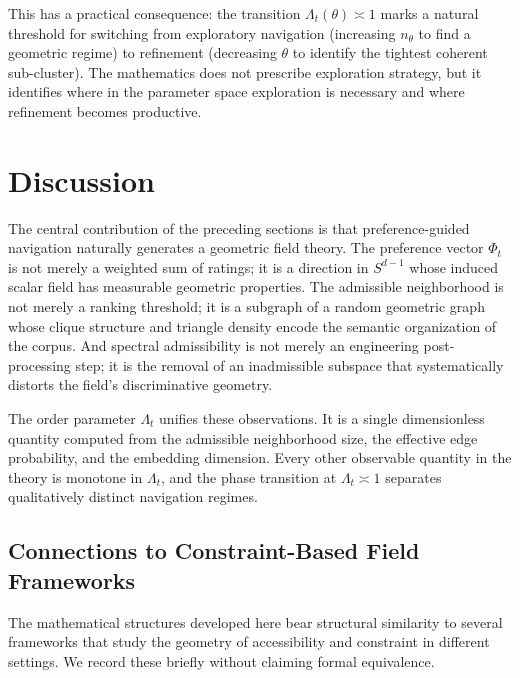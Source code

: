 \documentclass[12pt, a4paper]{article}
\theoremstyle{plain}
\theoremstyle{definition}
\begin{document}
This has a practical consequence: the transition $\Lambda_t(\theta) \asymp
1$ marks a natural threshold for switching from exploratory navigation
(increasing $n_\theta$ to find a geometric regime) to refinement
(decreasing $\theta$ to identify the tightest coherent sub-cluster). The
mathematics does not prescribe exploration strategy, but it identifies
where in the parameter space exploration is necessary and where refinement
becomes productive.

\section{Discussion}
\label{sec:discussion}

The central contribution of the preceding sections is that preference-guided
navigation naturally generates a geometric field theory. The preference
vector $\Phi_t$ is not merely a weighted sum of ratings; it is a direction
in $S^{d-1}$ whose induced scalar field has measurable geometric properties.
The admissible neighborhood is not merely a ranking threshold; it is a
subgraph of a random geometric graph whose clique structure and triangle
density encode the semantic organization of the corpus. And spectral
admissibility is not merely an engineering post-processing step; it is the
removal of an inadmissible subspace that systematically distorts the
field's discriminative geometry.

The order parameter $\Lambda_t$ unifies these observations. It is a
single dimensionless quantity computed from the admissible neighborhood
size, the effective edge probability, and the embedding dimension. Every
other observable quantity in the theory is monotone in $\Lambda_t$, and
the phase transition at $\Lambda_t \asymp 1$ separates qualitatively
distinct navigation regimes.

\subsection{Connections to Constraint-Based Field Frameworks}

The mathematical structures developed here bear structural similarity to
several frameworks that study the geometry of accessibility and constraint
in different settings. We record these briefly without claiming formal
equivalence.
\end{document}
